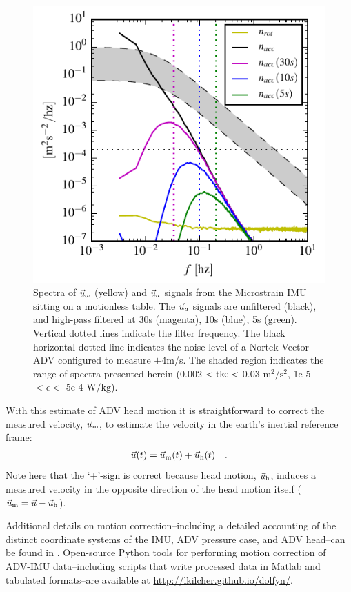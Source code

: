 \documentclass[twocol]{ametsoc}
\newlength{\onewidth}
\begin{document}
\begin{figure}
  \centering
  \label{fig:stationary_noise}
  \includegraphics[width=\onewidth]{stationary_noise03}
  \caption{Spectra of $\vec{u}_\omega$ (yellow) and $\vec{u}_a$ signals from the Microstrain IMU sitting on a motionless table. The $\vec{u}_a$ signals are unfiltered (black), and high-pass filtered at 30s (magenta), 10s (blue), 5s (green). Vertical dotted lines indicate the filter frequency. The black horizontal dotted line indicates the noise-level of a Nortek Vector ADV configured to measure $\pm$4m/s. The shaded region indicates the range of spectra presented herein (0.002 $< \mathrm{tke} <$ 0.03 $\mathrm{m^2/s^2}$, 1e-5 $< \epsilon <$ 5e-4 $\mathrm{W/kg}$).}
\end{figure}

With this estimate of ADV head motion it is straightforward to correct the measured velocity, $\vec{u}_\mathrm{m}$, to estimate the velocity in the earth's inertial reference frame:
\begin{align}
  \label{eqn:u_mot_def}
  \vec{u}(t) & = \vec{u}_\mathrm{m}(t) + \vec{u}_\mathrm{h}(t) &  .
\end{align}
Note here that the `+'-sign is correct because head motion, $\vec{u}_\mathrm{h}$, induces a measured velocity in the opposite direction of the head motion itself ($\vec{u}_\mathrm{m} = \vec{u} - \vec{u}_\mathrm{h}$).

Additional details on motion correction--including a detailed accounting of the distinct coordinate systems of the IMU, ADV pressure case, and ADV head--can be found in \cite{Kilcher++2016}. Open-source Python tools for performing motion correction of ADV-IMU data--including scripts that write processed data in Matlab and tabulated formats--are available at \url{http://lkilcher.github.io/dolfyn/}.
\end{document}
